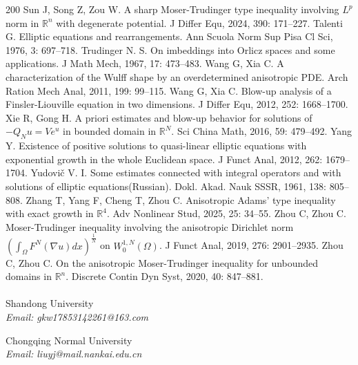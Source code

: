 \documentclass[11pt]{article}
\theoremstyle{plain}
\numberwithin{equation}{section}
\newcommand{\R}{\mathbb{R}}
\begin{document}
\begin{thebibliography}{200}
  Sun J,  Song Z,  Zou W. A sharp Moser-Trudinger type inequality involving $L^{p}$ norm in $\mathbb{R}^{n}$ with degenerate potential. J Differ Equ,
		2024, 390: 171--227. 	
  Talenti G.  Elliptic equations and rearrangements.  Ann Scuola Norm Sup Pisa Cl Sci,  1976, 3: 697--718.
  Trudinger  N. S. On imbeddings into Orlicz spaces and some applications.  J Math Mech,   1967, 17: 473--483.
  Wang G, Xia  C. A characterization of the Wulff shape by an overdetermined anisotropic PDE.  Arch Ration Mech Anal,  2011, 199: 99--115.
  Wang G,  Xia C. Blow-up analysis of a Finsler-Liouville equation in two dimensions.  J Differ Equ,  2012, 252: 1668--1700.
  Xie R, Gong  H.  A priori estimates and blow-up behavior for solutions of $-Q_{N}u=Ve^{u}$ in bounded domain in $\R^{N}$.  Sci China Math,  2016, 59: 479--492.
 Yang Y.  Existence of positive solutions to quasi-linear elliptic equations with exponential growth in the whole Euclidean space.  J Funct Anal,  2012, 262: 1679--1704.
  Yudovi\v{c} V. I. Some estimates connected with integral operators and with solutions of elliptic equations(Russian).  Dokl. Akad. Nauk SSSR, 1961, 138: 805--808.
  Zhang  T,  Yang  F,   Cheng  T,  Zhou C.  Anisotropic Adams' type inequality with exact
growth in $\R^{4}$.  Adv Nonlinear Stud,    2025, 25: 34--55.
 Zhou  C,   Zhou C.  Moser-Trudinger inequality involving the anisotropic Dirichlet norm $(\int_{\Omega}F^{N}(\nabla u)dx)^{\frac{1}{N}}$ on $W_{0}^{1,N}(\Omega)$.  J Funct Anal,  2019, 276: 2901--2935.
 Zhou  C, Zhou  C.  On the anisotropic Moser-Trudinger inequality for unbounded domains in $\R^{n}$.  Discrete Contin Dyn Syst,   2020, 40: 847--881.\\\\
Shandong University\\
\textit{Email: gkw17853142261@163.com}


Chongqing Normal University\\
\textit{Email: liuyj@mail.nankai.edu.cn}
\end{thebibliography}
\end{document}
